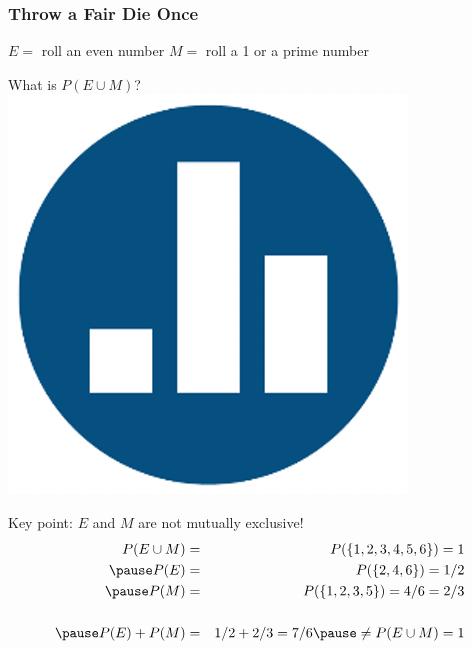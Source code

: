 \documentclass[handout]{beamer}
\begin{document}
\begin{frame}
\frametitle{Throw a Fair Die Once}
\begin{block}{$E = $ roll an even number \hfill $M = $ roll a 1 or a prime number}
\end{block}\pause
\begin{alertblock}{What is $P(E\cup M)$?\hfill \includegraphics[scale = 0.05]{./images/clicker} }\end{alertblock}
\pause
Key point: $E$ and $M$ are not mutually exclusive! \pause
	\begin{eqnarray*}
		P(E\cup M) &=& P(\{1,2,3,4,5,6\})= 1\\ \pause
		P(E) &=& P(\{2,4,6\}) = 1/2\\ \pause
		P(M) &=& P(\{1,2,3,5\}) = 4/6 = 2/3\\ \\ \pause
		P(E) + P(M) &=& 1/2 + 2/3 = 7/6 \pause \neq P(E\cup M) = 1
	\end{eqnarray*}

\end{frame}
\end{document}
